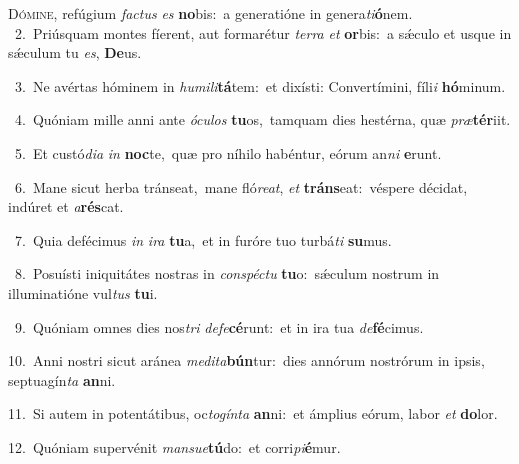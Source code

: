 \lettrine{\initial\textcolor{\initialcolor}{D}}{ómine,} refúgium \textit{fac}\-\textit{tus} \textit{es} \textbf{no}\-bis:~\star a generatióne in genera\-\textit{ti}\-\textbf{ó}nem.\\
{\numbfont\textcolor{\numbcolor}{~2.}}~Priúsquam montes fíerent, aut formarétur \textit{ter}\-\textit{ra} \textit{et} \textbf{or}\-bis:~\star a sǽculo et usque in sǽculum tu \textit{es}\-, \textbf{De}\-us.\par
{\numbfont\textcolor{\numbcolor}{~3.}}~Ne avértas hóminem in \textit{hu}\-\textit{mi}\textit{li}\textbf{tá}tem:~\star et dixísti: Convertímini, fíli\textit{i} \textbf{hó}\-minum.\par
{\numbfont\textcolor{\numbcolor}{~4.}}~Quóniam mille anni ante \textit{ó}\-\textit{cu}\textit{los} \textbf{tu}\-os,~\star tamquam dies hestérna, quæ \textit{præ}\-\textbf{tér}iit.\par
{\numbfont\textcolor{\numbcolor}{~5.}}~Et custó\-\textit{di}\-\textit{a} \textit{in} \textbf{noc}\-te,~\star quæ pro níhilo habéntur, eórum an\textit{ni} \textbf{e}\-runt.\par
{\numbfont\textcolor{\numbcolor}{~6.}}~Mane sicut herba tránseat,~\dagger mane fló\-\textit{re}\-\textit{at}, \textit{et} \textbf{tráns}\-eat:~\star véspere décidat, indúret et \textit{a}\-\textbf{rés}cat.\par
{\numbfont\textcolor{\numbcolor}{~7.}}~Quia defécimus \textit{in} \textit{i}\-\textit{ra} \textbf{tu}\-a,~\star et in furóre tuo turbá\textit{ti} \textbf{su}\-mus.\par
{\numbfont\textcolor{\numbcolor}{~8.}}~Posuísti iniquitátes nostras in \textit{con}\-\textit{spéc}\textit{tu} \textbf{tu}\-o:~\star sǽculum nostrum in illuminatióne vul\textit{tus} \textbf{tu}\-i.\par
{\numbfont\textcolor{\numbcolor}{~9.}}~Quóniam omnes dies nos\textit{tri} \textit{de}\-\textit{fe}\textbf{cé}runt:~\star et in ira tua \textit{de}\-\textbf{fé}cimus.\par
{\numbfont\textcolor{\numbcolor}{10.}}~Anni nostri sicut aránea \textit{me}\-\textit{di}\textit{ta}\textbf{bún}tur:~\star dies annórum nostrórum in ipsis, septuagín\textit{ta} \textbf{an}\-ni.\par
{\numbfont\textcolor{\numbcolor}{11.}}~Si autem in potentátibus, oc\-\textit{to}\-\textit{gín}\textit{ta} \textbf{an}\-ni:~\star et ámplius eórum, labor \textit{et} \textbf{do}\-lor.\par
{\numbfont\textcolor{\numbcolor}{12.}}~Quóniam supervénit \textit{man}\-\textit{su}\textit{e}\textbf{tú}do:~\star et corri\-\textit{pi}\-\textbf{é}mur.\par
